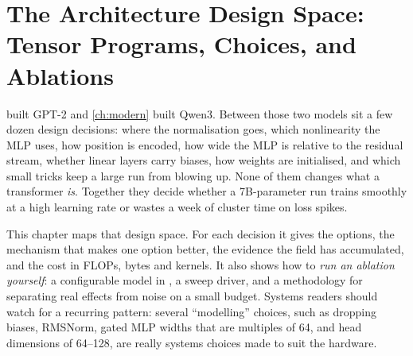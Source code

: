 \chapter{The Architecture Design Space: Tensor Programs, Choices, and Ablations}\label{ch:archdesign}

 built GPT-2 and \cref{ch:modern} built Qwen3. Between those two models sit a few
dozen design decisions: where the normalisation goes, which nonlinearity the MLP uses, how position
is encoded, how wide the MLP is relative to the residual stream, whether linear layers carry
biases, how weights are initialised, and which small tricks keep a large run from blowing up.
None of them changes what a transformer \emph{is}. Together they decide whether a 7B-parameter run
trains smoothly at a high learning rate or wastes a week of cluster time on loss spikes.

This chapter maps that design space. For each decision it gives the options, the mechanism that
makes one option better, the evidence the field has accumulated, and the cost in FLOPs, bytes and
kernels. It also shows how to \emph{run an ablation yourself}: a configurable model in
, a sweep driver, and a methodology for separating real effects from noise
on a small budget. Systems readers should watch for a recurring pattern: several ``modelling''
choices, such as dropping biases, RMSNorm, gated MLP widths that are multiples of 64, and head
dimensions of 64--128, are really systems choices made to suit the hardware.

